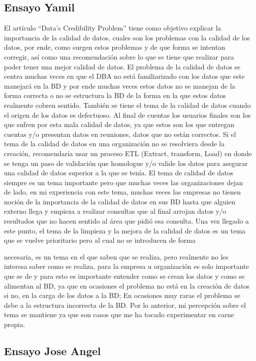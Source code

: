 \documentclass{exam}
\begin{document}
\subsection*{Ensayo Yamil}
El artículo “Data’s Credibility Problem” tiene como objetivo explicar la importancia de la calidad
de datos, cuales son los problemas con la calidad de los datos, por ende, como surgen estos
problemas y de que forma se intentan corregir, así como una recomendación sobre lo que se tiene
que realizar para poder tener una mejor calidad de datos.
El problema de la calidad de datos se centra muchas veces en que el DBA no está familiarizado con
los datos que este manejará en la BD y por ende muchas veces estos datos no se manejan de la
forma correcta o no se estructura la BD de la forma en la que estos datos realmente cobren
sentido. También se tiene el tema de la calidad de datos cuando el origen de los datos es
defectuoso. Al final de cuentas los usuarios finales son los que sufren por esta mala calidad de
datos, ya que estos son los que entregan cuentas y/o presentan datos en reuniones, datos que no
están correctos.
Si el tema de la calidad de datos en una organización no se resolviera desde la creación,
recomendaría usar un proceso ETL (Extract, transform, Load) en donde se tenga un paso de
validación que homologue y/o valide los datos para asegurar una calidad de datos superior a la
que se tenía. El tema de calidad de datos siempre es un tema importante pero que muchas veces
las organizaciones dejan de lado, en mi experiencia con este tema, muchas veces las empresas no
tienen noción de la importancia de la calidad de datos en sus BD hasta que alguien externo llega y
empieza a realizar consultas que al final arrojan datos y/o resultados que no hacen sentido al área
que pidió esa consulta. Una vez llegado a este punto, el tema de la limpieza y la mejora de la
calidad de datos es un tema que se vuelve prioritario pero al cual no se introducen de forma

necesaria, es un tema en el que saben que se realiza, pero realmente no les interesa saber como
se realiza, para la empresa u organización es solo importante que se de y para esto es importante
entender como se crean los datos y como se alimentan al BD, ya que en ocasiones el problema no
está en la creación de datos si no, en la carga de los datos a la BD; En ocasiones muy raras el
problema se debe a la estructura incorrecta de la BD. Por lo anterior, mi percepción sobre el tema
se mantiene ya que son casos que me ha tocado experimentar en carne propia.

\pagebreak

\subsection*{Ensayo Jose Angel}
\end{document}

